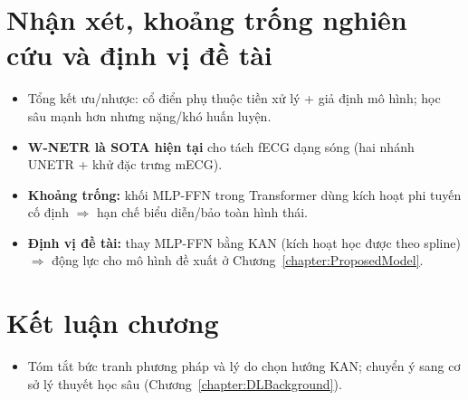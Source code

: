 \documentclass[../DoAn.tex]{subfiles}
\begin{document}
\section{Nhận xét, khoảng trống nghiên cứu và định vị đề tài}
\begin{itemize}
  \item Tổng kết ưu/nhược: cổ điển phụ thuộc tiền xử lý + giả định mô hình; học sâu mạnh hơn nhưng nặng/khó huấn luyện.
  \item \textbf{W-NETR là SOTA hiện tại} cho tách fECG dạng sóng (hai nhánh UNETR + khử đặc trưng mECG).
  \item \textbf{Khoảng trống:} khối MLP-FFN trong Transformer dùng kích hoạt phi tuyến cố định $\Rightarrow$ hạn chế biểu diễn/bảo toàn hình thái.
  \item \textbf{Định vị đề tài:} thay MLP-FFN bằng KAN (kích hoạt học được theo spline) $\Rightarrow$ động lực cho mô hình đề xuất ở Chương~\ref{chapter:ProposedModel}.
\end{itemize}

\section{Kết luận chương}
\begin{itemize}
  \item Tóm tắt bức tranh phương pháp và lý do chọn hướng KAN; chuyển ý sang cơ sở lý thuyết học sâu (Chương~\ref{chapter:DLBackground}).
\end{itemize}
\end{document}
